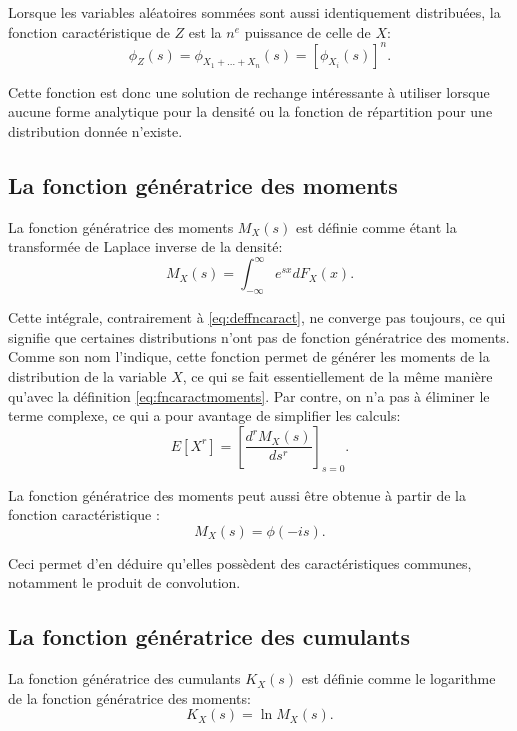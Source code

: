 Lorsque les variables aléatoires sommées sont aussi identiquement
distribuées, la fonction caractéristique de $Z$ est la $n^e$ puissance
de celle de $X$:
\begin{equation}
  \label{eq:convocaractIID}
  \phi_{Z}(s) = \phi_{X_1+\ldots+X_n}(s) = \left[\phi_{X_i}(s)\right]^n.
\end{equation}

Cette fonction est donc une solution de rechange intéressante à
utiliser lorsque aucune forme analytique pour la densité ou la
fonction de répartition pour une distribution donnée n'existe.

\subsection{La fonction génératrice des moments}
\label{sec:fgm}
La fonction génératrice des moments $M_X(s)$
 est définie comme étant la
transformée de Laplace inverse 
de la densité:
\begin{equation}
  \label{eq:deffngenmom}
  M_X(s) = \int_{-\infty}^{\infty} e^{sx} dF_X(x).
\end{equation}

Cette intégrale, contrairement à \eqref{eq:deffncaract}, ne converge
pas toujours, ce qui signifie que certaines distributions n'ont pas de
fonction génératrice des moments. Comme son nom l'indique, cette
fonction permet de générer les moments de la distribution de la
variable $X$, ce qui se fait essentiellement de la même manière
qu'avec la définition \eqref{eq:fncaractmoments}. Par contre, on n'a
pas à éliminer le terme complexe, ce qui a pour avantage de simplifier
les calculs:
\begin{equation}
  \label{eq:fgmmoments}
  E[X^r] = \left[ \frac{d^r M_X(s)}{ds^r} \right]_{s=0}.
\end{equation}

La fonction génératrice des moments peut aussi être obtenue à partir
de la fonction caractéristique :
\begin{equation}
  \label{eq:fncaractfgm}
  M_X(s) = \phi(-is).
\end{equation}

Ceci permet d'en déduire qu'elles possèdent des caractéristiques
communes, notamment le produit de convolution.

\subsection{La fonction génératrice des cumulants}
\label{sec:fgc}
La fonction génératrice des cumulants $K_X(s)$ est définie comme le
logarithme de la fonction génératrice des moments:
\begin{equation}
  \label{eq:fgc}
  K_X(s) = \ln{M_X(s)}.
\end{equation}

